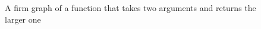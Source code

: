 \begin{figure}[h]
    \centering
    
    \caption{A firm graph of a function that takes two arguments and returns the larger one}
    \label{fig:basics:firm}
\end{figure}
